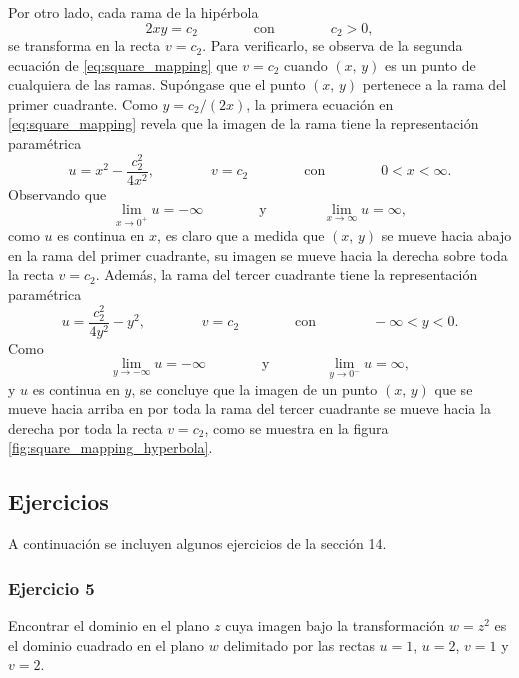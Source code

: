 \documentclass[a4paper]{report}
\begin{document}
Por otro lado, cada rama de la hipérbola 
\[
 2xy=c_2\qquad\qquad\textrm{con}\qquad\qquad c_2>0,
\]
se transforma en la recta \(v=c_2\). Para verificarlo, se observa de la segunda ecuación de \ref{eq:square_mapping} que \(v=c_2\) cuando \((x,\,y)\) es un punto de cualquiera de las ramas. Supóngase que el punto \((x,\,y)\) pertenece a la rama del primer cuadrante. Como \(y=c_2/(2x)\), la primera ecuación en \ref{eq:square_mapping} revela que la imagen de la rama tiene la representación paramétrica
\[
 u=x^2-\frac{c_2^2}{4x^2},\qquad\qquad v=c_2\qquad\qquad\textrm{con}\qquad\qquad0<x<\infty.
\]
Observando que 
\[
 \lim_{x\to0^+}u=-\infty
 \qquad\qquad\textrm{y}\qquad\qquad
 \lim_{x\to\infty}u=\infty,
\]
como \(u\) es continua en \(x\), es claro que a medida que \((x,\,y)\) se mueve hacia abajo en la rama del primer cuadrante, su imagen se mueve hacia la derecha sobre toda la recta \(v=c_2\). Además, la rama del tercer cuadrante tiene la representación paramétrica
\[
 u=\frac{c_2^2}{4y^2}-y^2,\qquad\qquad v=c_2\qquad\qquad\textrm{con}\qquad\qquad-\infty<y<0.
\]
Como
\[
 \lim_{y\to-\infty}u=-\infty
 \qquad\qquad\textrm{y}\qquad\qquad
 \lim_{y\to0^-}u=\infty,
\]
y \(u\) es continua en \(y\), se concluye que la imagen de un punto \((x,\,y)\) que se mueve hacia arriba en por toda la rama del tercer cuadrante se mueve hacia la derecha por toda la recta \(v=c_2\), como se muestra en la figura \ref{fig:square_mapping_hyperbola}.

\subsection{Ejercicios}

A continuación se incluyen algunos ejercicios de la sección 14.

\subsubsection{Ejercicio 5}

Encontrar el dominio en el plano \(z\) cuya imagen bajo la transformación \(w=z^2\) es el dominio cuadrado en el plano \(w\) delimitado por las rectas \(u=1\), \(u=2\), \(v=1\) y \(v=2\).
\end{document}

